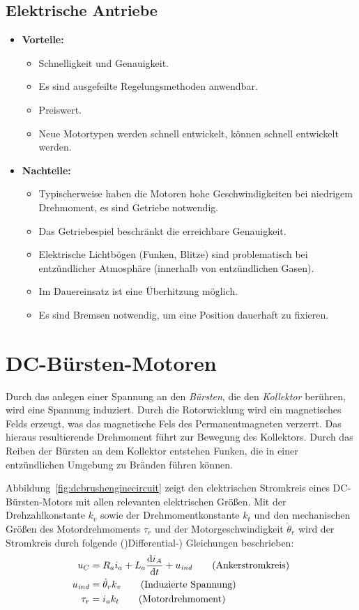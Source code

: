 		\subsection{Elektrische Antriebe}
			\begin{itemize}
				\item \textbf{Vorteile:}
					\begin{itemize}
						\item Schnelligkeit und Genauigkeit.
						\item Es sind ausgefeilte Regelungsmethoden anwendbar.
						\item Preiswert.
						\item Neue Motortypen werden schnell entwickelt, \bzw können schnell entwickelt werden.
					\end{itemize}
				\item \textbf{Nachteile:}
					\begin{itemize}
						\item Typischerweise haben die Motoren hohe Geschwindigkeiten bei niedrigem Drehmoment, \dh es sind Getriebe notwendig.
						\item Das Getriebespiel beschränkt die erreichbare Genauigkeit.
						\item Elektrische Lichtbögen (Funken, Blitze) sind problematisch bei entzündlicher Atmosphäre (\zB innerhalb von entzündlichen Gasen).
						\item Im Dauereinsatz ist eine Überhitzung möglich.
						\item Es sind Bremsen notwendig, um eine Position dauerhaft zu fixieren.
					\end{itemize}
			\end{itemize}

	\section{DC-Bürsten-Motoren}
		Durch das anlegen einer Spannung an den \emph{Bürsten}, die den \emph{Kollektor} berühren, wird eine Spannung induziert. Durch die Rotorwicklung wird ein magnetisches Felds erzeugt, was das magnetische Fels des Permanentmagneten verzerrt. Das hieraus resultierende Drehmoment führt zur Bewegung des Kollektors. Durch das Reiben der Bürsten an dem Kollektor entstehen Funken, die in einer entzündlichen Umgebung zu Bränden führen können.
		
		Abbildung~\ref{fig:dcbrushenginecircuit} zeigt den elektrischen Stromkreis eines DC-Bürsten-Motors mit allen relevanten elektrischen Größen. Mit der Drehzahlkonstante \(k_v\) sowie der Drehmomentkonstante \(k_t\) und den mechanischen Größen des Motordrehmoments \(\tau_r\) und der Motorgeschwindigkeit \(\dot{\theta}_r\) wird der Stromkreis durch folgende ()Differential-) Gleichungen beschrieben:
		\begin{align*}
			u_C            & = R_a i_a + L_a \dv{i_A}{t} + u_\mathit{ind} \tag{Ankerstromkreis}     \\
			u_\mathit{ind} & = \dot{\theta}_r k_v                         \tag{Induzierte Spannung} \\
			\tau_r         & = i_a k_t                                    \tag{Motordrehmoment}
		\end{align*}
		
